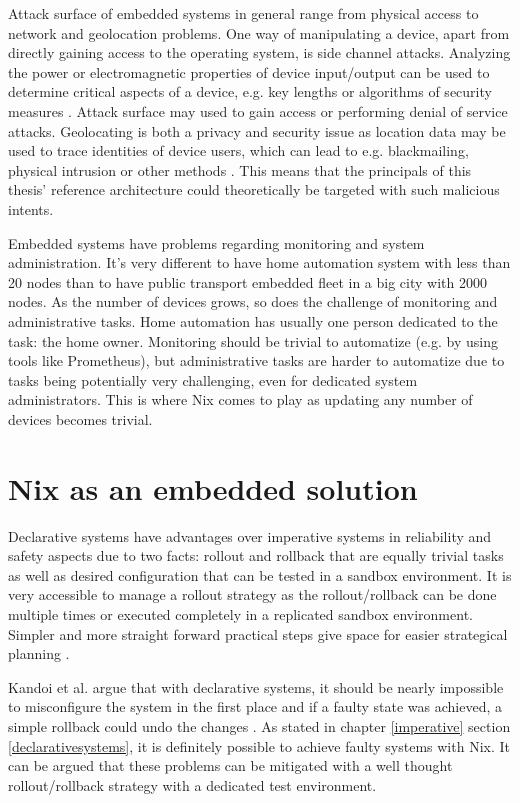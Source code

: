 Attack surface of embedded systems in general range from physical
access to network and geolocation problems. One way of manipulating a
device, apart from directly gaining access to the operating system,
is side channel attacks. Analyzing the power or electromagnetic
properties of device input/output can be used to determine critical
aspects of a device, e.g. key lengths or algorithms of security
measures \cite{fysarakis2014embedded, serpanos2013security}. Attack
surface may used to gain access or performing denial of service
attacks. Geolocating is both a privacy and security issue as location
data may be used to trace identities of device users, which can lead
to e.g. blackmailing, physical intrusion or other methods 
\cite{fysarakis2014embedded}. This means that the principals of this
thesis' reference architecture could theoretically be targeted with such malicious
intents.

Embedded systems have problems regarding monitoring and system
administration. It's very different to have home automation system
with less than 20 nodes than to have public transport embedded fleet
in a big city with 2000 nodes. As the number of devices grows, so does
the challenge of monitoring and administrative tasks. Home automation
has usually one person dedicated to the task: the home owner. Monitoring should be trivial to automatize (e.g. by using
tools like Prometheus), but administrative tasks are harder to
automatize due to tasks being potentially very challenging, even for
dedicated system administrators. This is where Nix comes to play as
updating any number of devices becomes trivial.


\section{Nix as an embedded solution} \label{nixosassolution}

Declarative systems have advantages over imperative systems in
reliability and safety aspects due to two facts: rollout and rollback
that are equally trivial tasks as well as desired configuration that can be tested in a
sandbox environment. It is very accessible to manage a rollout strategy
as the rollout/rollback can be done multiple times or executed
completely in a replicated sandbox environment. Simpler and more straight forward practical steps give space for
easier strategical planning \cite{kandoi2021operating}.

Kandoi et al. argue that with declarative systems, it should be nearly
impossible to misconfigure the system in the first place and if a faulty
state was achieved, a simple rollback could undo the changes
\cite{kandoi2021operating}. As stated in chapter \ref{imperative}
section \ref{declarativesystems}, it is definitely possible to achieve
faulty systems with Nix. It can be argued that these problems can be mitigated
with a well thought rollout/rollback strategy with a dedicated test environment.

